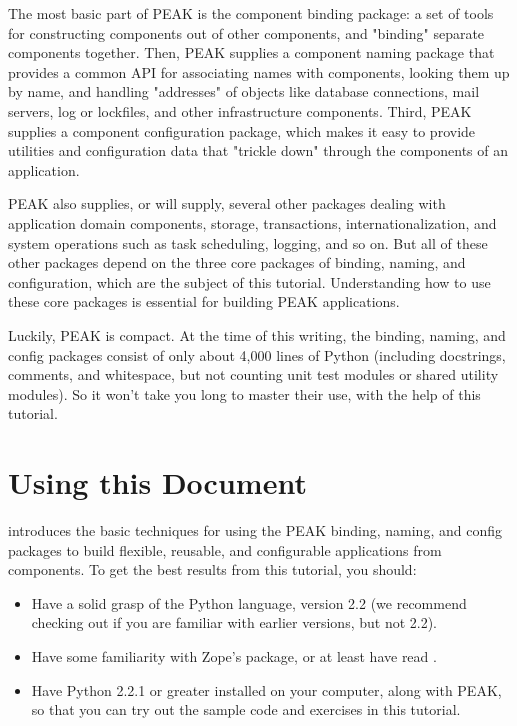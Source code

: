 The most basic part of PEAK is the component binding package: a set of
tools for constructing components out of other components, and "binding"
separate components together. Then, PEAK supplies a component naming
package that provides a common API for associating names with
components, looking them up by name, and handling "addresses" of objects
like database connections, mail servers, log or lockfiles, and other
infrastructure components. Third, PEAK supplies a component
configuration package, which makes it easy to provide utilities and
configuration data that "trickle down" through the components of an
application. 

PEAK also supplies, or will supply, several other packages dealing with
application domain components, storage, transactions,
internationalization, and system operations such as task scheduling,
logging, and so on. But all of these other packages depend on the three
core packages of binding, naming, and configuration, which are the
subject of this tutorial.  Understanding how to use these core packages
is essential for building PEAK applications. 

Luckily, PEAK is compact. At the time of this writing, the binding,
naming, and config packages consist of only about 4,000 lines of Python
(including docstrings, comments, and whitespace, but not counting unit
test modules or shared utility modules). So it won't take you long to
master their use, with the help of this tutorial. 




\section{Using this Document}

 introduces
the basic techniques for using the PEAK binding, naming, and config
packages to build flexible, reusable, and configurable applications from
components. To get the best results from this tutorial, you should:

\begin{itemize}

\item Have a solid grasp of the Python language, version 2.2 (we
recommend checking out 
if you are familiar with earlier versions, but not 2.2).

\item Have some familiarity with Zope's  package, or at least
have read .

\item Have Python 2.2.1 or greater installed on your computer, along
with PEAK, so that you can try out the sample code and exercises in this
tutorial.

\end{itemize}

